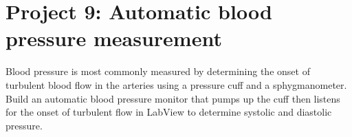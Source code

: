 \documentclass[12pt]{article}
\begin{document}
%
%
%
%
%

\newpage

\section*{Project 9: Automatic blood pressure measurement}

Blood pressure is most commonly measured by determining the onset of turbulent blood flow in the arteries using a pressure cuff and a sphygmanometer. 
Build an automatic blood pressure monitor that pumps up the cuff then listens for the onset of turbulent flow in LabView to determine systolic and diastolic pressure.

\newpage
\end{document}
